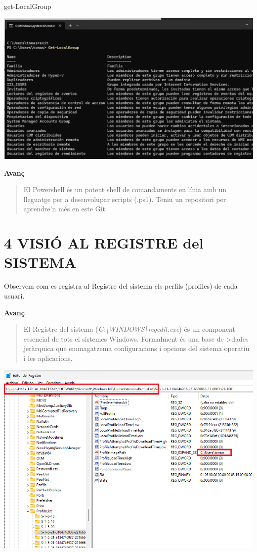 \documentclass[
  a4paper,
]{article}
\newenvironment{Shaded}{\begin{snugshade}}{\end{snugshade}}
\newcommand{\NormalTok}[1]{#1}
\begin{document}
\begin{Shaded}
\begin{Highlighting}[]
\NormalTok{get{-}LocalGroup}
\end{Highlighting}
\end{Shaded}

\includegraphics{png/get-LocalGroup.png}

\textbf{Avanç}

\begin{quote}
El Powershell és un potent shell de comandaments en línia amb un
lleguatge per a desenvolupar scripts (.ps1). Teniu un repositori per
aprendre'n més en este Git
\end{quote}

\section{4 VISIÓ AL REGISTRE del
SISTEMA}\label{visiuxf3-al-registre-del-sistema}

Observem com es registra al Registre del sistema els perfils (profiles)
de cada usuari.

\textbf{Avanç}

\begin{quote}
El Registre del sistema
(\emph{C:\textbackslash WINDOWS\textbackslash regedit.exe}) és un
component essencial de tots el sistemes Windows. Formalment és una base
de \textgreater dades jeràrquica que emmagatzema configuracions i
opcions del sistema operatiu i les aplicacions.
\end{quote}

\includegraphics{png/regedit.png}
\end{document}
